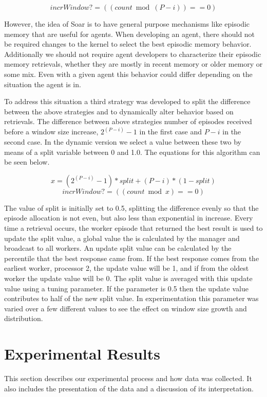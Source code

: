\documentclass[11pt]{article} %
\begin{document}
\begin{equation}incrWindow? = ((count  \bmod  (P-i) ) == 0)\label{eq.1}\end{equation}

However, the idea of Soar is to have general purpose mechanisms like episodic
memory that are useful for agents. When developing an agent, there should not be
required changes to the kernel to select the best episodic memory behavior.
Additionally we should not require agent developers to characterize their
episodic memory retrievals, whether they are mostly in recent memory or older
memory or some mix. Even with a given agent this behavior could differ depending
on the situation the agent is in.

To address this situation a third strategy was developed to split the difference
between the above strategies and to dynamically alter behavior based on
retrievals. The difference between above strategies number of episodes received
before a window size increase, $2^(P-i) -1$ in the first case and $P-i$ in the
second case. In the dynamic version we select a value between these two by means
of a split variable between 0 and 1.0. The equations for this algorithm can be
seen below.

\begin{equation}x = (2^(P-i) -1)*split + (P-i) *(1-split)\end{equation}
\begin{equation}incrWindow? = ((count \bmod x) == 0)\end{equation}

The value of split is initially set to 0.5, splitting the difference evenly so
that the episode allocation is not even, but also less than exponential in
increase. Every time a retrieval occurs, the worker episode that returned the
best result is used to update the split value, a global value the is calculated
by the manager and broadcast to all workers. An update split value can be
calculated by the percentile that the best response came from. If the best
response comes from the earliest worker, processor 2, the update value will be
1, and if from the oldest worker the update value will be 0. The split value is
averaged with this update value using a tuning parameter. If the parameter is
0.5 then the update value contributes to half of the new split value. In
experimentation this parameter was varied over a few different values to see the
effect on window size growth and distribution.

\section{Experimental Results}
This section describes our experimental process and how data was collected. 
It also includes the presentation of the data and a discussion of its interpretation. 
\end{document}
